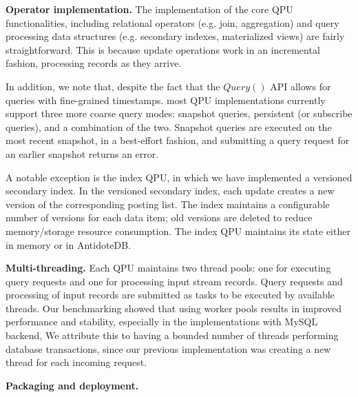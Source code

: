 \bigskip
\noindent
\textbf{Operator implementation.}
The implementation of the core QPU functionalities,
including relational operators (e.g. join, aggregation) and query processing data structures (e.g. secondary indexes,
materialized views) are fairly straightforward.
This is because update operations work in an incremental fashion,
processing records as they arrive.


In addition, we note that, despite the fact that the $Query()$ API allows for queries with fine-grained timestamps.
most QPU implementations currently support three more coarse query modes:
snapshot queries, persistent (or subscribe queries), and a combination of the two.
Snapshot queries are executed on the most recent snapshot, in a best-effort fashion,
and submitting a query request for an earlier snapshot returns an error.

A notable exception is the index QPU, in which we have implemented a versioned secondary index.
In the versioned secondary index,
each update creates a new version of the corresponding posting list.
The index maintains a configurable number of versions for each data item;
old versions are deleted to reduce memory/storage resource consumption.
The index QPU maintains its state either in memory or in AntidoteDB.

\bigskip
\noindent
\textbf{Multi-threading.}
Each QPU maintains two thread pools: one for executing query requests and one for processing input stream records.
Query requests and processing of input records are submitted as tasks to be executed by available threads.
Our benchmarking showed that using worker pools results in improved performance and stability,
especially in the implementations with MySQL backend,
We attribute this to having a bounded number of threads performing database transactions,
since our previous implementation was creating a new thread for each incoming request.

\bigskip
\noindent
\textbf{Packaging and deployment.}
\todo{}